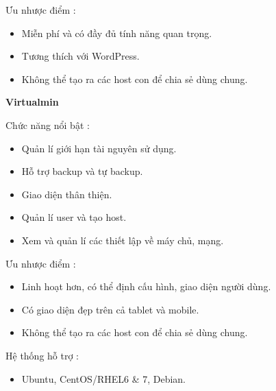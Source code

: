    		Ưu nhược điểm :
   			\begin{itemize}
   				\item Miễn phí và có đầy đủ tính năng quan trọng.
   				\item Tương thích với WordPress.
   				\item Không thể tạo ra các host con để chia sẻ dùng chung.
   			\end{itemize}
   		\textbf {Virtualmin}
   		
   		Chức năng nổi bật :
   		\begin{itemize}
   			\item Quản lí giới hạn tài nguyên sử dụng.
   			\item Hỗ trợ backup và tự backup.
   			\item Giao diện thân thiện.
   			\item Quản lí user và tạo host.
   			\item Xem và quản lí các thiết lập về máy chủ, mạng.
   		\end{itemize}
   		
   		Ưu nhược điểm :
   		\begin{itemize}
   			\item Linh hoạt hơn, có thể định cấu hình, giao diện người dùng.
   			\item Có giao diện đẹp trên cả tablet và mobile.
   			\item Không thể tạo ra các host con để chia sẻ dùng chung.
   		\end{itemize}
   	
   		Hệ thống hỗ trợ :
   		\begin{itemize}
   			\item Ubuntu, CentOS/RHEL6 \& 7, Debian.
   		\end{itemize}